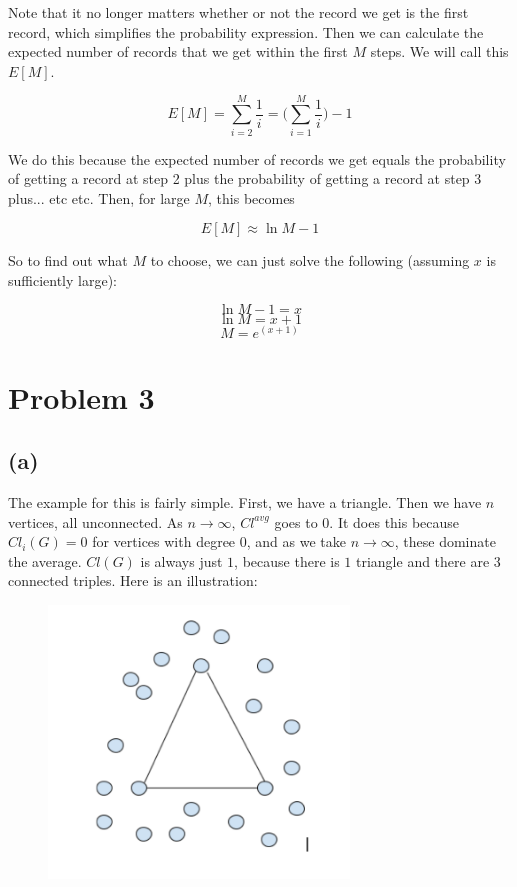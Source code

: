\documentclass{article}
\begin{document}
\noindent Note that it no longer matters whether or not the record we get is the 
first record, which simplifies the probability expression. Then we can calculate the 
expected number of records that we get within the first $M$ steps. We will call this 
$E[M]$.

\[ E[M] = \sum_{i = 2}^M \frac{1}{i} = \big( \sum_{i = 1}^M \frac{1}{i} \big) - 1 \]

\noindent We do this because the expected number of records we get equals the 
probability of getting a record at step 2 plus the probability of getting a 
record at step 3 plus... etc etc. Then, for large $M$, this becomes

\[ E[M] \approx \ln M - 1 \]

\noindent So to find out what $M$ to choose, we can just solve the following (assuming
$x$ is sufficiently large):

\[ \ln M - 1 = x \]
\[ \ln M = x + 1 \]
\[ M = e^{(x + 1)} \]

\section*{Problem 3}
\subsection*{(a)}
The example for this is fairly simple. First, we have a triangle. Then we
have $n$ vertices, all unconnected. As $n \rightarrow \infty$, $Cl^{avg}$ goes to
$0$. It does this because $Cl_i(G) = 0$ for vertices with degree 0, and as we take
$n \rightarrow \infty$, these dominate the average. $Cl(G)$ is always just $1$, 
because there is $1$ triangle and there are $3$ connected triples. Here is an illustration:

\begin{figure}[h]
    \includegraphics[width=8cm]{graph2}
\end{figure}
\end{document}
